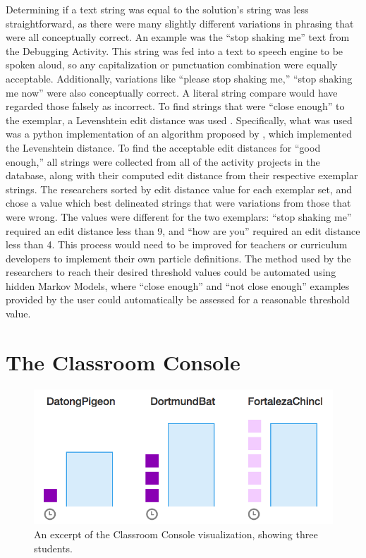 \label{sec:close-enough-text} %
Determining if a text string was equal to the solution's string was less straightforward, as there were many slightly different variations in phrasing that were all conceptually correct. An example was the ``stop shaking me'' text from the Debugging Activity. This string was fed into a text to speech engine to be spoken aloud, so any capitalization or punctuation combination were equally acceptable. Additionally, variations like ``please stop shaking me,'' ``stop shaking me now'' were also conceptually correct. A literal string compare would have regarded those falsely as incorrect. To find strings that were ``close enough'' to the exemplar, a Levenshtein edit distance was used \citep{levenshtein1966binary}. Specifically, what was used was a python implementation of an algorithm proposed by \citet{hyyro2001explaining}, which implemented the Levenshtein distance. To find the acceptable edit distances for ``good enough,'' all strings were collected from all of the activity projects in the database, along with their computed edit distance from their respective exemplar strings. The researchers sorted by edit distance value for each exemplar set, and chose a value which best delineated strings that were variations from those that were wrong. The values were different for the two exemplars: ``stop shaking me'' required an edit distance less than 9, and ``how are you'' required an edit distance less than 4. This process would need to be improved for teachers or curriculum developers to implement their own particle definitions. The method used by the researchers to reach their desired threshold values could be automated using hidden Markov Models, where ``close enough'' and ``not close enough'' examples provided by the user could automatically be assessed for a reasonable threshold value.


\section{The Classroom Console}
\label{sec:classroom-console}

\begin{figure}
  \centering
      \includegraphics{images/ch4-console-demo}
  \caption[Excerpt of the Classroom Console]{An excerpt of the Classroom Console visualization, showing three students.}
  \label{fig:console-demo}
\end{figure}


